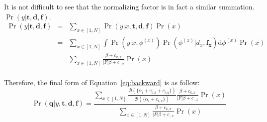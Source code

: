 It is not difficult to see that the normalizing factor is in fact a similar summation.
$\Pr(y|\mathbf{t}, \mathbf{d}, \mathbf{f})$.
\begin{eqnarray}
  \Pr(y|\mathbf{t}, \mathbf{d}, \mathbf{f})
  &=& \sum_{x \in [1, N]} \Pr(y|x, \mathbf{t}, \mathbf{d}, \mathbf{f}) \Pr(x) \nonumber\\
  &=& \sum_{x \in [1, N]} \int \Pr(y|x, \phi^{(x)}) \Pr(\phi^{(x)}|d_x, \mathbf{f_x}) \mathrm{d}\phi^{(x)} \Pr(x) \nonumber\\
  &=& \sum_{x \in [1, N]} \frac{\beta + c_{k,x}}{|F|\beta + c_{\cdot,x}} \Pr(x) \nonumber\\
\end{eqnarray}

Therefore, the final form of Equation~\eqref{eq:backward} is as follow:
\begin{equation}
  \Pr(\mathbf{q}|y, \mathbf{t}, \mathbf{d}, \mathbf{f}) = 
  \frac{\sum_{x \in [1, N]} \frac{\mathcal{B}(\{\alpha_i + c_{i,x} + c_{i,q} \})}{\mathcal{B}(\{\alpha_i + c_{i,x} \})} \frac{\beta + c_{k,x}}{|F|\beta + c_{\cdot,x}} \Pr(x)}
  {\sum_{x \in [1, N]} \frac{\beta + c_{k,x}}{|F|\beta + c_{\cdot,x}} \Pr(x)}
\end{equation}

